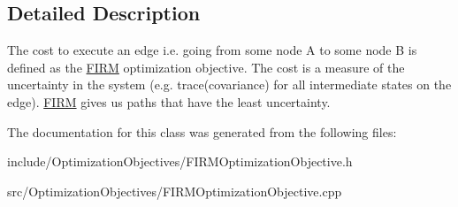 \subsection{\-Detailed \-Description}
\-The cost to execute an edge i.\-e. going from some node \-A to some node \-B is defined as the \hyperlink{class_f_i_r_m}{\-F\-I\-R\-M} optimization objective. \-The cost is a measure of the uncertainty in the system (e.\-g. trace(covariance) for all intermediate states on the edge). \hyperlink{class_f_i_r_m}{\-F\-I\-R\-M} gives us paths that have the least uncertainty. 

\-The documentation for this class was generated from the following files\-:\begin{DoxyCompactItemize}
\item 
include/\-Optimization\-Objectives/\-F\-I\-R\-M\-Optimization\-Objective.\-h\item 
src/\-Optimization\-Objectives/\-F\-I\-R\-M\-Optimization\-Objective.\-cpp\end{DoxyCompactItemize}
